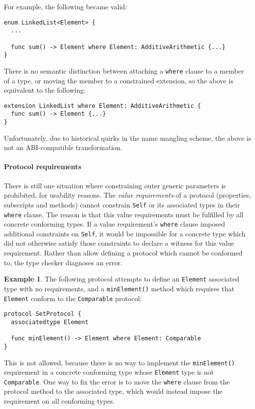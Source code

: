 \documentclass[a4paper,headsepline,bibliography=totoc,toc=flat,fleqn,twoside=semi]{scrbook}
\theoremstyle{definition}
\theoremstyle{definition}
\newtheorem{example}{Example}[chapter]
\theoremstyle{definition}
\begin{document}
For example, the following became valid:
\begin{Verbatim}
enum LinkedList<Element> {
  ...
  
  func sum() -> Element where Element: AdditiveArithmetic {...}
}
\end{Verbatim}
There is no semantic distinction between attaching a \texttt{where} clause to a member of a type, or moving the member to a constrained extension, so the above is equivalent to the following:
\begin{Verbatim}
extension LinkedList where Element: AdditiveArithmetic {
  func sum() -> Element {...}
}
\end{Verbatim}
Unfortunately, due to historical quirks in the name mangling scheme, the above is not an ABI-compatible transformation.

\paragraph{Protocol requirements}
There is still one situation where constraining outer generic parameters is prohibited, for usability reasons. The \emph{value requirements} of a protocol (properties, subscripts and methods) cannot constrain \texttt{Self} or its associated types in their \texttt{where} clause. The reason is that this value requirements must be fulfilled by all concrete conforming types. If a value requirement's \texttt{where} clause imposed additional constraints on \texttt{Self}, it would be impossible for a concrete type which did not otherwise satisfy those constraints to declare a witness for this value requirement. Rather than allow defining a protocol which cannot be conformed to, the type checker diagnoses an error.
\begin{example}
The following protocol attempts to define an \texttt{Element} associated type with no requirements, and a \texttt{minElement()} method which requires that \texttt{Element} conform to the \texttt{Comparable} protocol:
\begin{Verbatim}
protocol SetProtocol {
  associatedtype Element
  
  func minElement() -> Element where Element: Comparable
}
\end{Verbatim}
This is not allowed, because there is no way to implement the \texttt{minElement()} requirement in a concrete conforming type whose \texttt{Element} type is not \texttt{Comparable}. One way to fix the error is to move the \texttt{where} clause from the protocol method to the associated type, which would instead impose the requirement on all conforming types.\end{example}
\end{document}
